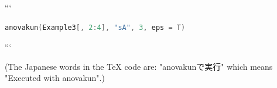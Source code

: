 ```
\begin{lstlisting}[language=c++,label={code:23_14},caption={Executed with anovakun}]
anovakun(Example3[, 2:4], "sA", 3, eps = T)
\end{lstlisting}
```

(The Japanese words in the TeX code are: "anovakunで実行" which means "Executed with anovakun".)
